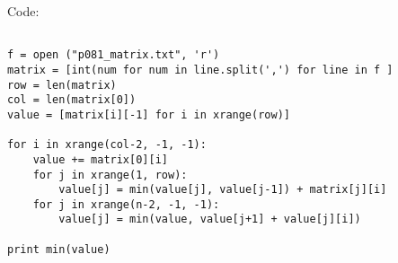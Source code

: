 \documentclass{article}
\begin{document}
Code:
    \begin{verbatim}
    
f = open ("p081_matrix.txt", 'r')
matrix = [int(num for num in line.split(',') for line in f ]
row = len(matrix)
col = len(matrix[0])
value = [matrix[i][-1] for i in xrange(row)]

for i in xrange(col-2, -1, -1):
	value += matrix[0][i]
	for j in xrange(1, row):
		value[j] = min(value[j], value[j-1]) + matrix[j][i]
	for j in xrange(n-2, -1, -1):
		value[j] = min(value, value[j+1] + value[j][i])

print min(value)

  \end{verbatim}
\end{document}
